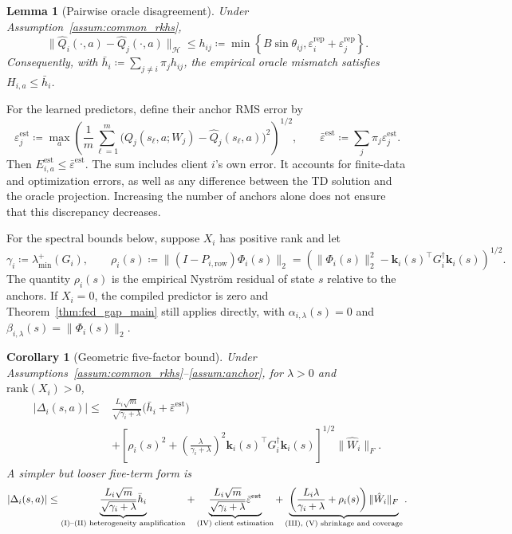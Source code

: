 \documentclass[sigconf,anonymous]{aamas}
\theoremstyle{plain}
\newtheorem{lemma}{Lemma}
\newtheorem{corollary}{Corollary}
\theoremstyle{definition}
\theoremstyle{remark}
\newcommand{\defeq}{\coloneqq}
\begin{document}
\begin{lemma}[Pairwise oracle disagreement]
\label{lem:term_A}
Under Assumption~\ref{assum:common_rkhs},
\begin{equation}
\|\hat Q_i(\cdot,a)-\hat Q_j(\cdot,a)\|_{\mathcal H}
\le
h_{ij}
\defeq
\min\left\{
B\sin\theta_{ij},
\varepsilon_i^{\mathrm{rep}}+\varepsilon_j^{\mathrm{rep}}
\right\}.
\label{eq:pairwise_clean}
\end{equation}
Consequently, with
$\bar h_i\defeq\sum_{j\ne i}\pi_jh_{ij}$,
the empirical oracle mismatch satisfies $H_{i,a}\le\bar h_i$.
\end{lemma}

For the learned predictors, define their anchor RMS error by
\[
\varepsilon_j^{\mathrm{est}}
\defeq
\max_a
\left(
\frac1m\sum_{\ell=1}^m
\bigl(Q_j(s_\ell,a;W_j)-\hat Q_j(s_\ell,a)\bigr)^2
\right)^{1/2},
\qquad
\bar\varepsilon^{\mathrm{est}}
\defeq
\sum_j\pi_j\varepsilon_j^{\mathrm{est}}.
\]
Then $E_{i,a}^{\mathrm{est}}\le\bar\varepsilon^{\mathrm{est}}$.
The sum includes client $i$'s own error.  It accounts for finite-data
and optimization errors, as well as any difference between the TD
solution and the oracle projection.  Increasing the number of anchors
alone does not ensure that this discrepancy decreases.

For the spectral bounds below, suppose $X_i$ has positive rank and let
\[
\gamma_i\defeq\lambda_{\min}^+(G_i),\qquad
\rho_i(s)
\defeq
\|(I-P_{i,\mathrm{row}})\Phi_i(s)\|_2
=
\left(
\|\Phi_i(s)\|_2^2-
\mathbf k_i(s)^\top G_i^\dagger\mathbf k_i(s)
\right)^{1/2}.
\]
The quantity $\rho_i(s)$ is the empirical Nystr\"om residual of state
$s$ relative to the anchors.  If $X_i=0$, the compiled predictor is
zero and Theorem~\ref{thm:fed_gap_main} still applies directly, with
$\alpha_{i,\lambda}(s)=0$ and
$\beta_{i,\lambda}(s)=\|\Phi_i(s)\|_2$.

\begin{corollary}[Geometric five-factor bound]
\label{cor:geometric_gap}
Under Assumptions~\ref{assum:common_rkhs}--\ref{assum:anchor},
for $\lambda>0$ and $\mathrm{rank}(X_i)>0$,
\begin{align}
|\Delta_i(s,a)|
\le{}&
\frac{L_i\sqrt m}{\sqrt{\gamma_i+\lambda}}
\bigl(\bar h_i+\bar\varepsilon^{\mathrm{est}}\bigr)
\nonumber\\
&+
\left[
\rho_i(s)^2+
\left(\frac{\lambda}{\gamma_i+\lambda}\right)^2
\mathbf k_i(s)^\top G_i^\dagger\mathbf k_i(s)
\right]^{1/2}
\|\hat W_i\|_F .
\label{eq:fed_gap_bound}
\end{align}
A simpler but looser five-term form is
\begin{equation}
|\Delta_i(s,a)|
\le
\underbrace{
\frac{L_i\sqrt m}{\sqrt{\gamma_i+\lambda}}\bar h_i
}_{\textup{(I)--(II) heterogeneity amplification}}
+
\underbrace{
\frac{L_i\sqrt m}{\sqrt{\gamma_i+\lambda}}
\bar\varepsilon^{\mathrm{est}}
}_{\textup{(IV) client estimation}}
+
\underbrace{
\left(
\frac{L_i\lambda}{\gamma_i+\lambda}+\rho_i(s)
\right)\|\hat W_i\|_F
}_{\textup{(III), (V) shrinkage and coverage}} .
\label{eq:fed_gap_five_term}
\end{equation}
\end{corollary}
\end{document}
